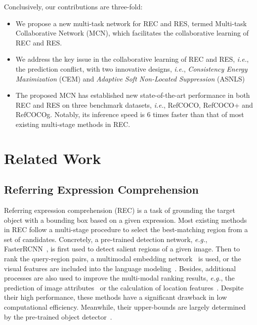 \documentclass[10pt,twocolumn,letterpaper]{article}
\begin{document}
Conclusively, our contributions are  three-fold:
\begin{itemize}
	\item  We propose a new multi-task network for REC and RES, termed  Multi-task Collaborative Network (MCN), which facilitates  the collaborative learning  of REC and RES. 
	
	\item We address the key issue in the collaborative learning of REC and RES, \emph{i.e.}, the prediction conflict, with two innovative designs, \emph{i.e.},  \emph{Consistency Energy Maximization} (CEM) and \emph{Adaptive Soft Non-Located Suppression} (ASNLS)
	
	\item The proposed MCN has established  new state-of-the-art performance  in both REC and RES on three benchmark datasets, \emph{i.e.}, RefCOCO, RefCOCO+ and RefCOCOg. 
	Notably, its inference speed is 6 times faster than that of  most existing multi-stage methods in REC. 
\end{itemize}



\section{Related Work}

\subsection{Referring Expression Comprehension}
Referring expression comprehension (REC) is a task of grounding  the target object with a bounding box based on a given  expression. Most existing methods~\cite{hu2017modeling,hu2016natural,liu2017referring,luo2017comprehension-guided,yu2016modeling,yu2017a,zhang2017discriminative,yu2018mattnet:,wang2019neighbourhood} in REC follow a multi-stage procedure  to select  the best-matching region from a set of candidates. Concretely, a pre-trained detection network, \emph{e.g.}, FasterRCNN~\cite{ren2017faster}, is first  used to detect salient regions of a given image. 
Then to rank the query-region pairs,  a multimodal embedding network~\cite{rohrbach2016grounding,wang2016learning,liu2017referring,chen2017query-guided,zhang2018grounding}  is used,  or  the visual features  are included  into the language modeling~\cite{mao2016generation,baxter2000model,luo2017comprehension-guided,hu2016natural,yu2016modeling}. 
Besides, additional processes are also used to improve  the multi-modal ranking  results, \emph{e.g.}, the prediction of image attributes~\cite{MATT:} or the calculation of location features~\cite{yu2017a,wang2019neighbourhood}. 
Despite their high performance, these methods  have a significant drawback  in low  computational efficiency. Meanwhile, their  upper-bounds are largely determined by the pre-trained object detector~\cite{sadhu2017zero}. 
\end{document}
